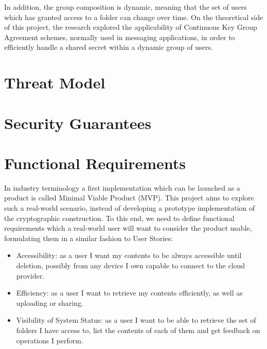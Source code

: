 In addition, the group composition is dynamic, meaning that the set of users which has granted access to a folder can change over time.
On the theoretical side of this project, the research explored the applicability of Continuous Key Group Agreement schemes,
normally used in messaging applications, in order to efficiently handle a shared secret within a dynamic group of users.

\section{Threat Model} \label{sc:threatmodel}


\section{Security Guarantees} \label{sc:securityguarantees}

\section{Functional Requirements} \label{sc:functionalrequirements}

In industry terminology a first implementation which can be launched as a product is called Minimal Viable Product (MVP).
This project aims to explore such a real-world scenario, instead of developing a prototype implementation of the cryptographic construction.
To this end, we need to define functional requirements which a real-world user will want to consider the product usable, formulating them in a similar fashion to User Stories:
\begin{itemize}
    \item Accessibility: as a user I want my contents to be always accessible until deletion, possibly from any device I own capable to connect to the cloud provider.
    \item Efficiency: as a user I want to retrieve my contents efficiently, as well as uploading or sharing.
    \item Visibility of System Status: as a user I want to be able to retrieve the set of folders I have access to, list the contents of each of them and get feedback on operations I perform.
\end{itemize}


